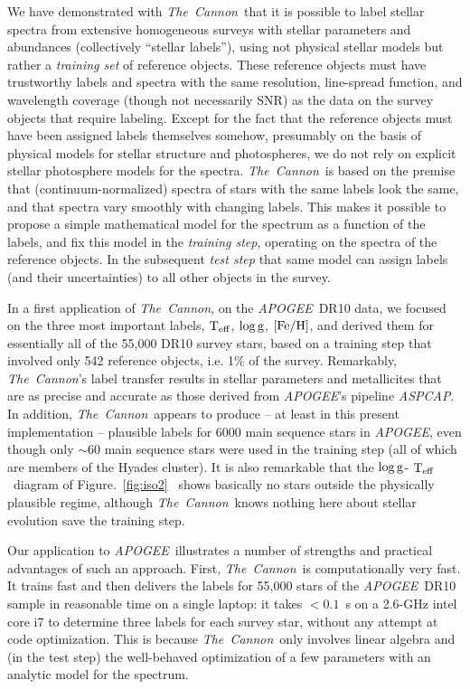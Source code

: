 \documentclass[12pt, preprint]{aastex}
\newcommand{\tc}{\textsl{The~Cannon}}
\newcommand{\apogee}{\textsl{APOGEE}}
\newcommand{\aspcap}{\textsl{ASPCAP}}
\newcommand{\teff}{\mbox{$\rm T_{eff}$}}
\newcommand{\feh}{\mbox{$\rm [Fe/H]$}}
\newcommand{\logg}{\mbox{$\rm \log g$}}
\begin{document}
We have demonstrated with \tc\ that it is possible to label stellar
spectra from extensive homogeneous surveys with stellar parameters 
and abundances (collectively ``stellar labels''), using not physical stellar models but rather a
\emph{training set} of reference objects. These reference objects must have trustworthy
labels and spectra with the same resolution, line-spread function, and
wavelength coverage (though not necessarily SNR) as the data on the 
survey objects that require labeling.
Except for the fact that the reference objects must have been assigned
labels themselves somehow, presumably on the basis of physical models for stellar 
structure and photospheres, we do not rely on explicit stellar photosphere models
for the spectra. \tc\  is based on the premise that (continuum-normalized) spectra of stars with the same labels
look the same, and that spectra vary smoothly with changing labels. 
This makes it possible to propose a simple mathematical model for the spectrum as a function of the
labels, and fix this model in the \textit{training step}, operating on the spectra of the reference objects.
In the subsequent \textit{test step} that same model can assign labels (and their uncertainties) to all
other objects in the survey.

In a first application of \tc, on the \apogee\ DR10 data, we focused on the three most important labels, \teff, \logg, \feh , and 
derived them for essentially all of the 55,000 DR10 survey stars, based on a training step that involved only 542 reference objects, i.e. 1\% of the survey.  Remarkably, \tc 's label transfer results in stellar parameters and metallicites that are as precise and accurate as those derived from
\apogee 's pipeline \aspcap. In addition, \tc\ appears to produce -- at least in this present implementation -- plausible labels for 6000 main sequence stars in \apogee, even though only $\sim 60$ main sequence stars were used in the training step (all of which are members of the Hyades cluster). 
It is also remarkable that  the \logg - \teff\  diagram of Figure.~\ref{fig:iso2}~ shows basically no stars outside
the physically plausible regime, although \tc\ knows nothing here about stellar evolution save the training step.

Our application to \apogee\  illustrates a number of strengths and practical advantages of such an approach. First, \tc\ is computationally very fast. It  trains fast and then delivers the labels for 55,000 stars of the
 \apogee\ DR10 sample in reasonable time on a single laptop: it takes $<0.1$~s on a 2.6-GHz
intel core i7 to determine three labels for each survey star, without any
attempt at code optimization. This is because \tc\  only involves linear algebra and (in the test step) the well-behaved optimization of a few parameters with an analytic model for the spectrum. 
\end{document}
